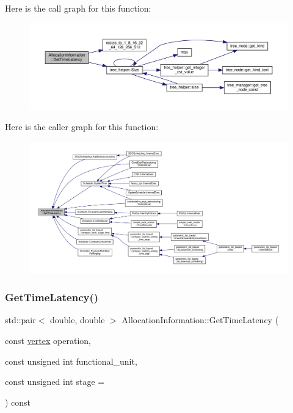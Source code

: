 Here is the call graph for this function\+:
\nopagebreak
\begin{figure}[H]
\begin{center}
\leavevmode
\includegraphics[width=350pt]{d7/d79/classAllocationInformation_a9958c6919a34a32bd500f4b8470d8b85_cgraph}
\end{center}
\end{figure}
Here is the caller graph for this function\+:
\nopagebreak
\begin{figure}[H]
\begin{center}
\leavevmode
\includegraphics[width=350pt]{d7/d79/classAllocationInformation_a9958c6919a34a32bd500f4b8470d8b85_icgraph}
\end{center}
\end{figure}
\mbox{\label{classAllocationInformation_a040ec5fdf120433b32443c08d73b57ef}} 
\subsubsection{\texorpdfstring{Get\+Time\+Latency()}{GetTimeLatency()}\hspace{0.1cm}{\footnotesize\ttfamily [2/2]}}
{\footnotesize\ttfamily std\+::pair$<$ double, double $>$ Allocation\+Information\+::\+Get\+Time\+Latency (\begin{DoxyParamCaption}\item[{const \hyperlink{graph_8hpp_abefdcf0544e601805af44eca032cca14}{vertex}}]{operation,  }\item[{const unsigned int}]{functional\+\_\+unit,  }\item[{const unsigned int}]{stage = {} }\end{DoxyParamCaption}) const}



